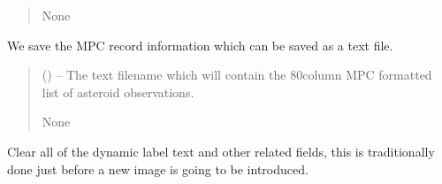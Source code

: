 \documentclass[letterpaper,11pt,english]{sphinxmanual}
\begin{document}
\begin{savenotes}
\begin{fulllineitems}
\begin{savenotes}
\begin{fulllineitems}
\begin{quote}
\begin{description}
\sphinxAtStartPar
None

\end{description}\end{quote}

\end{fulllineitems}\end{savenotes}


\begin{savenotes}\begin{fulllineitems}
\label{\detokenize{code/opihiexarata.gui.manual:opihiexarata.gui.manual.OpihiManualWindow._save_mpc_record_results}}
\pysigstartsignatures
{}
\pysigstopsignatures
\sphinxAtStartPar
We save the MPC record information which can be saved as a
text file.
\begin{quote}\begin{description}
\sphinxAtStartPar
{} () – The text filename which will contain the 80\sphinxhyphen{}column MPC formatted
list of asteroid observations.

\sphinxAtStartPar
None

\end{description}\end{quote}

\end{fulllineitems}\end{savenotes}


\begin{savenotes}\begin{fulllineitems}
\label{\detokenize{code/opihiexarata.gui.manual:opihiexarata.gui.manual.OpihiManualWindow.clear_dynamic_label_text}}
\pysigstartsignatures
{}
\pysigstopsignatures
\sphinxAtStartPar
Clear all of the dynamic label text and other related fields,
this is traditionally done just before a new image is going to be
introduced.


\end{fulllineitems}
\end{savenotes}
\end{fulllineitems}
\end{savenotes}
\end{document}
